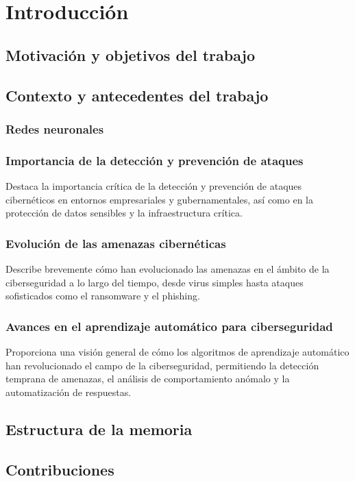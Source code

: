 \chapter{Introducción} \label{Capitulo 1}
      



\section{Motivación y objetivos del trabajo} \label{Sec:1_1}

    
\section{Contexto y antecedentes del trabajo} \label{Sec:1_2}

\subsection{Redes neuronales} \label{Subsubsec: 1_2_1}
  
\subsection{Importancia de la detección y prevención de ataques} \label{Subsec: 1_2_2}

Destaca la importancia crítica de la detección y prevención de ataques cibernéticos en entornos empresariales y gubernamentales, así como en la protección de datos sensibles y la infraestructura crítica.

\subsection{Evolución de las amenazas cibernéticas} \label{Subsec: 1_2_3}

Describe brevemente cómo han evolucionado las amenazas en el ámbito de la ciberseguridad a lo largo del tiempo, desde virus simples hasta ataques sofisticados como el ransomware y el phishing.

\subsection{Avances en el aprendizaje automático para ciberseguridad} \label{Subsubsec: 1_2_4}

Proporciona una visión general de cómo los algoritmos de aprendizaje automático han revolucionado el campo de la ciberseguridad, permitiendo la detección temprana de amenazas, el análisis de comportamiento anómalo y la automatización de respuestas.


\section{Estructura de la memoria} \label{Subsubsec: 1_3}
  


\section{Contribuciones} \label{Subsec: 1_4}
